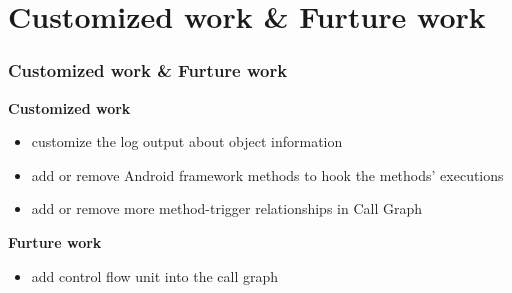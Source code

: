 \documentclass{beamer}
\begin{document}
\section{Customized work \& Furture work}
\begin{frame}
\frametitle{Customized work \& Furture work}
\textbf{Customized work}
\begin{itemize}
	\item customize the log output about object information
	\item add or remove Android framework methods to hook the methods' executions
	\item add or remove more method-trigger relationships in Call Graph 
\end{itemize}

\textbf{Furture work}
\begin{itemize}
\item add control flow unit into the call graph
\end{itemize}
\end{frame}
\end{document}
